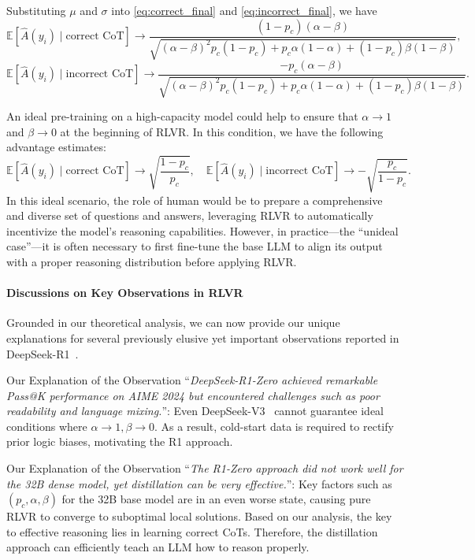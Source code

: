 Substituting $\mu$ and $\sigma$ into \eqref{eq:correct_final} and \eqref{eq:incorrect_final}, we have
\[
\mathbb{E}[\hat{A}(y_i) \mid \text{correct CoT}]
\rightarrow
\frac{(1 - p_c)(\alpha - \beta)}{\sqrt{
(\alpha - \beta)^2 p_c (1 - p_c) + p_c \alpha(1 - \alpha) + (1 - p_c)\beta(1 - \beta)
}} ,
\]
\[
\mathbb{E}[\hat{A}(y_i) \mid \text{incorrect CoT}]
\rightarrow
\frac{-p_c(\alpha - \beta)}{\sqrt{
(\alpha - \beta)^2 p_c (1 - p_c) + p_c \alpha(1 - \alpha) + (1 - p_c)\beta(1 - \beta)
}} .
\]

An ideal pre-training on a high-capacity model could help to ensure that $\alpha \rightarrow 1$ and $\beta \rightarrow 0$ at the beginning of RLVR. In this condition, we have the following advantage estimates:
\[
\mathbb{E}[\hat{A}(y_i) \mid \text{correct CoT}]
\rightarrow
\sqrt{\frac{1-p_c}{p_c}},
\quad
\mathbb{E}[\hat{A}(y_i) \mid \text{incorrect CoT}]
\rightarrow
- \sqrt{\frac{p_c}{1-p_c}}.
\]
In this ideal scenario, the role of human would be to prepare a comprehensive and diverse set of questions and answers, leveraging RLVR to automatically incentivize the model's reasoning capabilities. However, in practice—the ``unideal case''—it is often necessary to first fine-tune the base LLM to align its output with a proper reasoning distribution before applying RLVR.

\paragraph{Discussions on Key Observations in RLVR}
Grounded in our theoretical analysis, we can now provide our unique explanations for several previously elusive yet important observations reported in DeepSeek-R1~\citep{guo2025deepseek-r1}.

Our Explanation of the Observation ``\emph{DeepSeek-R1-Zero achieved remarkable Pass@K performance on AIME 2024 but encountered challenges such as poor readability and language mixing.}'': 
Even DeepSeek-V3~\citep{liu2024deepseek-v3} cannot guarantee ideal conditions where $\alpha \rightarrow 1, \beta \rightarrow 0$. As a result, cold-start data is required to rectify prior logic biases, motivating the R1 approach.

Our Explanation of the Observation ``\emph{The R1-Zero approach did not work well for the 32B dense model, yet distillation can be very effective.}'': 
Key factors such as $(p_c, \alpha, \beta)$ for the 32B base model are in an even worse state, causing pure RLVR to converge to suboptimal local solutions. Based on our analysis, the key to effective reasoning lies in learning correct CoTs. Therefore, the distillation approach can efficiently teach an LLM how to reason properly.

